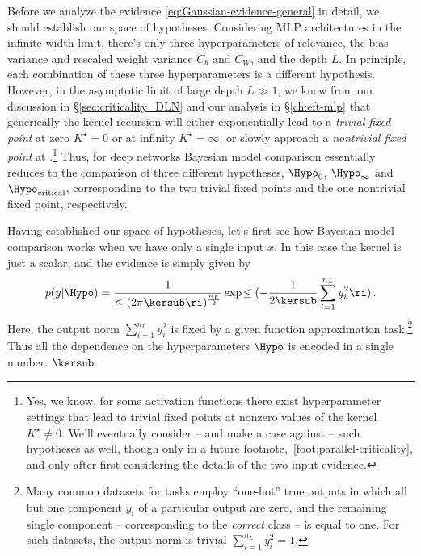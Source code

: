 Before we analyze the evidence \eqref{eq:Gaussian-evidence-general} in detail, we should establish our space of hypotheses.
Considering MLP architectures in the infinite-width limit, there's only three hyperparameters of relevance, the bias variance and rescaled weight variance $C_b$ and $C_W$, and the depth $L$. In principle, each combination of these three hyperparameters is a different hypothesis. However, in the asymptotic limit of large depth $L \gg 1$, we know from our discussion in \S\ref{sec:criticality_DLN} and our analysis in \S\ref{ch:eft-mlp} that generically the kernel recursion will either exponentially lead to a \emph{trivial fixed point} at zero $K^\star=0$ or at infinity $K^\star =\infty$, or slowly approach a \emph{nontrivial fixed point} at .\footnote{Yes, we know, for some activation functions there exist hyperparameter settings that lead to trivial fixed points at nonzero values of the kernel $K^{\star}\ne0$. We'll eventually consider -- and make a case against -- such hypotheses as well, though only in a future footnote,~\ref{foot:parallel-criticality}, and only after first considering the details of the two-input evidence.}
Thus, for deep networks Bayesian model comparison essentially reduces to the comparison of three different hypotheses, $\Hypo_{0}$, $\Hypo_{\infty}$ and $\Hypo_{\text{critical}}$, corresponding to the two trivial fixed points and the one nontrivial fixed point, respectively.



Having established our space of hypotheses, let's first see how Bayesian model comparison works when we have only a single input $x$.
In this case the kernel is just a scalar, and the evidence is simply given by
\begin{align}\label{eq:Gaussian-evidence-single}
p(y\vert\Hypo) = \frac{1}{\le(2\pi \kersub\ri)^{\frac{n_{L}}{2}}} \exp\!\le(-\frac{1}{2\kersub}\sum_{i=1}^{n_{L}}y_{i}^2\ri)\, .
\end{align}
Here, the output norm $\sum_{i=1}^{n_{L}}y_{i}^2$ is fixed by a given function approximation task.\footnote{
Many common datasets for  tasks employ ``one-hot'' true outputs in which all but one component $y_i$ of a particular output are zero, and the remaining single component -- corresponding to the \emph{correct} class -- is equal to one. For such datasets, the output norm is trivial $\sum_{i=1}^{n_{L}}y_{i}^2 = 1$.
}
Thus all the dependence on the hyperparameters $\Hypo$ is encoded in a single number: $\kersub$.



